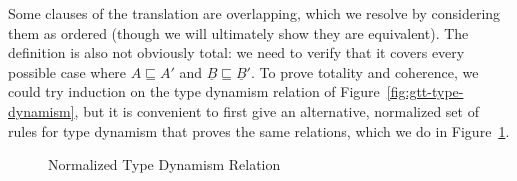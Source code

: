 \documentclass[acmsmall,nonacm]{acmart}
\renewcommand{\u}{\underline}
\newcommand{\floor}[1]{\lfloor#1\rfloor}
\newcommand{\ltdyn}{\sqsubseteq}
\newcommand{\dynv}{{?}}
\newcommand{\dync}{\u {\text{?`}}}
\newcommand{\with}{\mathbin{\&}}
\begin{document}
\begin{longonly}
Some clauses of the translation are overlapping, which we resolve by
considering them as ordered (though we will ultimately show they are
equivalent).
%
The definition is also not obviously total: we need to verify that it
covers every possible case where $A \ltdyn A'$ and $\u B \ltdyn \u
B'$.
%
To prove totality and coherence, we could try induction on the type
dynamism relation of Figure~\ref{fig:gtt-type-dynamism}, but it is
convenient to first give an alternative, normalized set of rules for
type dynamism that proves the same relations, which we do in
Figure~\ref{fig:normalized}.

\begin{figure}
\begin{small}
  \end{small}
  \caption{Normalized Type Dynamism Relation}
  \label{fig:normalized}
\end{figure}


\end{longonly}
\end{document}
